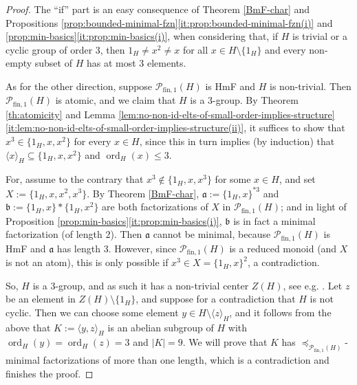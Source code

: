\documentclass{report}
\newcommand{\gen}[1]{\langle #1 \rangle}
\newcommand{\fun}{{\textrm{fin}, 1}}
\newcommand{\ord}{{\operatorname{ord}}}
\renewcommand{\:}{\text{:}}
\theoremstyle{definition}
\begin{document}
\begin{proof}
	The ``if'' part is an easy consequence of Theorem \ref{BmF-char} and Propositions \ref{prop:bounded-minimal-fzn}\ref{it:prop:bounded-minimal-fzn(i)} and \ref{prop:min-basics}\ref{it:prop:min-basics(i)}, when considering that, if $H$ is trivial or a cyclic group of order $3$, then $1_H \ne x^2 \ne x$ for all $x \in H \setminus \{1_H\}$ and every non-empty subset of $H$ has at most $3$ elements.
	
	
	As for the other direction, suppose $\mathcal P_\fun(H)$ is HmF and $H$ is non-trivial. Then $\mathcal P_\fun(H)$ is atomic, and we claim that $H$ is a $3$-group. By Theorem \ref{th:atomicity} and Lemma \ref{lem:no-non-id-elts-of-small-order-implies-structure}\ref{it:lem:no-non-id-elts-of-small-order-implies-structure(ii)}, it suffices to show that
	$
	x^3 \in \{1_H, x, x^2\}$ for every $x \in H$, since this in turn implies (by induction) that $\langle x \rangle_H \subseteq \{1_H, x, x^2\}$ and $\ord_H(x) \le 3$.
	
	For, assume to the contrary that $x^3 \notin \{1_H, x, x^3\}$ for some $x \in H$, and set $X := \{1_H, x, x^2, x^3\}$. By Theorem \ref{BmF-char}, $\mathfrak a := \{1_H, x\}^{\ast 3}$ and $\mathfrak b := \{1_H, x\} \ast \{1_H, x^2\}$ are both factorizations of $X$ in $\mathcal P_\fun(H)$; and in light of Proposition \ref{prop:min-basics}\ref{it:prop:min-basics(i)}, $\mathfrak b$ is in fact a minimal factorization (of length $2$). Then $\mathfrak a$ cannot be minimal, because $\mathcal P_\fun(H)$ is HmF and $\mathfrak a$ has length $3$. However, since $\mathcal P_\fun(H)$ is a reduced monoid (and $X$ is not an atom), this is only possible if $x^3 \in X = \{1_H, x\}^2$, a contradiction.
	
	So, $H$ is a $3$-group, and as such it has a non-trivial center $Z(H)$, see e.g. \cite[Theorem 2.11(i)]{Gor1980}. Let $z$ be an element in $Z(H) \setminus \{1_H\}$, and suppose for a contradiction that $H$ is not cyclic. Then we can choose some element $y \in H \setminus \gen{z}_H$, and it follows from the above that $K := \gen{y,z}_H$ is an abelian subgroup of $H$ with $\ord_H(y) = \ord_H(z) = 3$ and $|K| = 9$. 
	We will prove that $K$ has $\preceq_{\mathcal P_\fun(H)}$-minimal factorizations of more than one length, which is a contradiction and finishes the proof.
	

\end{proof}
\end{document}
